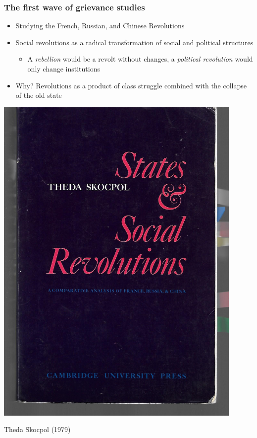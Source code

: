 \documentclass[aspectratio=43]{beamer}
\begin{document}
\begin{frame}
\frametitle{The first wave of grievance studies}
\centering

\begin{minipage}{0.59\textwidth}\centering
\begin{itemize}
  \item Studying the French, Russian, and Chinese Revolutions
  \item Social revolutions as a radical transformation of social and political structures
  \begin{itemize}
     \item A \textit{rebellion} would be a revolt without changes, a \textit{political revolution} would only change institutions
   \end{itemize}
  \item<2-> Why? Revolutions as a product of class struggle combined with the collapse of the old state
\end{itemize}
\end{minipage}\hfill
\begin{minipage}{0.4\textwidth}\centering
\includegraphics[width = 0.9\textwidth]{img/skocpol}

Theda Skocpol (1979)
\end{minipage}

\end{frame}
\end{document}
